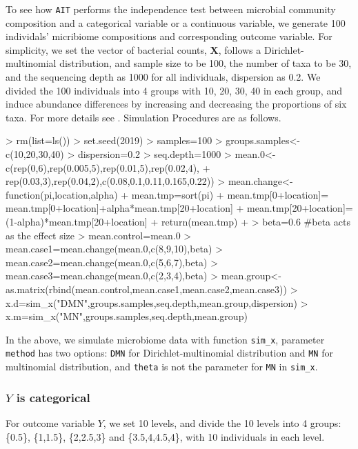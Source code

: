 \documentclass[a4paper,11pt]{article}
\newcommand{\Rcode}[1]{{\texttt{#1}}}
\begin{document}
To see how \texttt{AIT} performs the independence test between microbial community
composition and a categorical variable or a continuous variable, we generate 100 individals' micribiome compositions and corresponding outcome variable. For simplicity, we set the vector of bacterial counts, $\bm{X}$, follows a Dirichlet-multinomial distribution, and sample size to be 100, the number of taxa to be 30, and the sequencing depth as 1000 for all individuals, dispersion as 0.2. We divided the 100 individuals into 4 groups with 10, 20, 30, 40 in each group, and induce abundance differences by increasing and decreasing the proportions of six taxa. For more details see \cite{song2019an}. Simulation Procedures are as follows.


\begin{Schunk}
\begin{Sinput}
> rm(list=ls())
> set.seed(2019)
> samples=100
> groups.samples<-c(10,20,30,40)
> dispersion=0.2
> seq.depth=1000
> mean.0<-c(rep(0,6),rep(0.005,5),rep(0.01,5),rep(0.02,4),
+ rep(0.03,3),rep(0.04,2),c(0.08,0.1,0.11,0.165,0.22))
> mean.change<-function(pi,location,alpha){
+   mean.tmp=sort(pi)
+   mean.tmp[0+location]= mean.tmp[0+location]+alpha*mean.tmp[20+location]
+   mean.tmp[20+location]= (1-alpha)*mean.tmp[20+location]
+   return(mean.tmp)
+ }
> beta=0.6  #beta acts as the effect size
> mean.control=mean.0
> mean.case1=mean.change(mean.0,c(8,9,10),beta)
> mean.case2=mean.change(mean.0,c(5,6,7),beta)
> mean.case3=mean.change(mean.0,c(2,3,4),beta)
> mean.group<-as.matrix(rbind(mean.control,mean.case1,mean.case2,mean.case3))
> x.d=sim_x("DMN",groups.samples,seq.depth,mean.group,dispersion)
> x.m=sim_x("MN",groups.samples,seq.depth,mean.group)
\end{Sinput}
\end{Schunk}

In the above, we simulate microbiome data with function \Rcode{sim\_x}, parameter \Rcode{method} has two options: \Rcode{DMN} for Dirichlet-multinomial distribution and \Rcode{MN} for multinomial distribution, and \Rcode{theta} is not the parameter for \Rcode{MN} in \Rcode{sim\_x}.

\subsubsection{$Y$ is categorical}
For outcome variable $Y$, we set 10 levels, and divide the 10 levels into 4 groups: \{0.5\}, \{1,1.5\}, \{2,2.5,3\} and \{3.5,4,4.5,4\}, with 10 individuals in each level.
\end{document}
